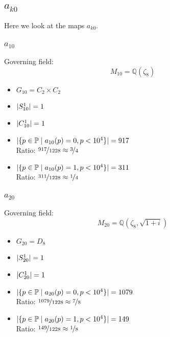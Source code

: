\subsection{$a_{k0}$}
Here we look at the maps $a_{k0}$.

\subsubsection{$a_{10}$}
Governing field:
$$M_{10} = \mathbb{Q}\left(\zeta_8\right)$$
\begin{multicols}{2}
	\begin{itemize}
		\item $G_{10} = C_2 \times C_2$
		\item $| S_{10}^1 | = 1$
		\item $| C_{10}^1 | = 1$
	\end{itemize}
	\begin{itemize}
		\item $| \{ p \in \mathbb{P} \mid a_{10}(p)=0, p<10^4 \} | = 917$\\
		Ratio: $\nicefrac{ 917 }{ 1228 } \approx \nicefrac{ 3 }{ 4 }$
		\item $| \{ p \in \mathbb{P} \mid a_{10}(p)=1, p<10^4 \} | = 311$\\
		Ratio: $\nicefrac{ 311 }{ 1228 } \approx \nicefrac{ 1 }{ 4 }$
	\end{itemize}
\end{multicols}

\subsubsection{$a_{20}$}
Governing field:
$$M_{20} = \mathbb{Q}\left(\zeta_8, \sqrt{1+i}\right)$$
\begin{multicols}{2}
	\begin{itemize}
		\item $G_{20} = D_8$
		\item $| S_{20}^1 | = 1$
		\item $| C_{20}^1 | = 1$
	\end{itemize}
	\begin{itemize}
		\item $| \{ p \in \mathbb{P} \mid a_{20}(p)=0, p<10^4 \} | = 1079$\\
		Ratio: $\nicefrac{ 1079 }{ 1228 } \approx \nicefrac{ 7 }{ 8 }$
		\item $| \{ p \in \mathbb{P} \mid a_{20}(p)=1, p<10^4 \} | = 149$\\
		Ratio: $\nicefrac{ 149 }{ 1228 } \approx \nicefrac{ 1 }{ 8 }$
	\end{itemize}
\end{multicols}

